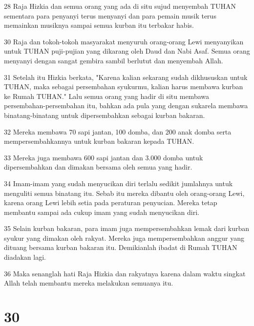 \par 28 Raja Hizkia dan semua orang yang ada di situ sujud menyembah TUHAN sementara para penyanyi terus menyanyi dan para pemain musik terus memainkan musiknya sampai semua kurban itu terbakar habis.
\par 30 Raja dan tokoh-tokoh masyarakat menyuruh orang-orang Lewi menyanyikan untuk TUHAN puji-pujian yang dikarang oleh Daud dan Nabi Asaf. Semua orang menyanyi dengan sangat gembira sambil berlutut dan menyembah Allah.
\par 31 Setelah itu Hizkia berkata, "Karena kalian sekarang sudah dikhususkan untuk TUHAN, maka sebagai persembahan syukurmu, kalian harus membawa kurban ke Rumah TUHAN." Lalu semua orang yang hadir di situ membawa persembahan-persembahan itu, bahkan ada pula yang dengan sukarela membawa binatang-binatang untuk dipersembahkan sebagai kurban bakaran.
\par 32 Mereka membawa 70 sapi jantan, 100 domba, dan 200 anak domba serta mempersembahkannya untuk kurban bakaran kepada TUHAN.
\par 33 Mereka juga membawa 600 sapi jantan dan 3.000 domba untuk dipersembahkan dan dimakan bersama oleh semua yang hadir.
\par 34 Imam-imam yang sudah menyucikan diri terlalu sedikit jumlahnya untuk menguliti semua binatang itu. Sebab itu mereka dibantu oleh orang-orang Lewi, karena orang Lewi lebih setia pada peraturan penyucian. Mereka tetap membantu sampai ada cukup imam yang sudah menyucikan diri.
\par 35 Selain kurban bakaran, para imam juga mempersembahkan lemak dari kurban syukur yang dimakan oleh rakyat. Mereka juga mempersembahkan anggur yang dituang bersama kurban bakaran itu. Demikianlah ibadat di Rumah TUHAN diadakan lagi.
\par 36 Maka senanglah hati Raja Hizkia dan rakyatnya karena dalam waktu singkat Allah telah membantu mereka melakukan semuanya itu.

\chapter{30}

